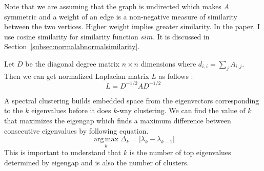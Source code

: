 Note that we are assuming that the graph is undirected which makes $A$ symmetric and a weight of an edge is a non-negative measure of similarity between the two vertices. 
Higher weight implies greater similarity. 
In the paper, I use cosine similarity for similarity function $sim$. It is discussed in Section~\ref{subsec:normalabnormalsimilarity}. 

Let $D$ be the diagonal degree matrix $n \times n$ dimensions where $d_{i,i} = \sum_{j} A_{i,j}$. 
Then we can get normalized Laplacian matrix $L$ as follows : 
\begin{equation}
L = D^{-1/2} A D^{-1/2}
\end{equation}

A spectral clustering builds embedded space from the eigenvectors corresponding to the $k$ eigenvalues before it does $k$-way clustering. 
We can find the value of $k$ that maximizes the eigengap which finds a maximum difference between consecutive eigenvalues by following equation. 
\begin{equation}
\operatorname*{arg\,max}_{k} \Delta_k = | \lambda_k - \lambda_{k-1} | 
\end{equation}
This is important to understand that $k$ is the number of top eigenvalues determined by eigengap and is also the number of clusters. 

